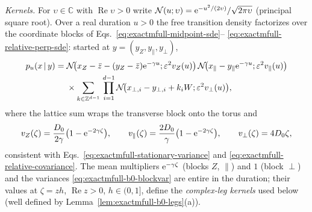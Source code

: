 \emph{Kernels.}
For \(\upsilon\in\mathbb C\) with \(\operatorname{Re}\upsilon>0\) write
\(\mathcal N(u;\upsilon)=\mathrm e^{-u^2/(2\upsilon)}/\sqrt{2\pi\upsilon}\)
(principal square root).  Over a real duration \(u>0\) the free transition
density factorizes over the coordinate blocks of
Eqs.~\eqref{eq:exactmfull-midpoint-sde}--%
\eqref{eq:exactmfull-relative-perp-sde}: started at
\(y=(y_Z,y_\parallel,y_\perp)\),
\begin{equation}
 \begin{split}
 p_u(x\,|\,y)
 ={}&\mathcal N\!\bigl(x_Z-\bar z-(y_Z-\bar z)\mathrm e^{-\gamma u};
   \varepsilon^2v_Z(u)\bigr)\,
  \mathcal N\!\bigl(x_\parallel-y_\parallel\mathrm e^{-\gamma u};
   \varepsilon^2v_\parallel(u)\bigr)\\
 &\times
  \sum_{k\in\mathbb Z^{d-1}}\,
  \prod_{i=1}^{d-1}
  \mathcal N\!\bigl(x_{\perp,i}-y_{\perp,i}+k_iW;
   \varepsilon^2v_\perp(u)\bigr),
 \end{split}
 \label{eq:exactmfull-b0-kernels}
\end{equation}
where the lattice sum wraps the transverse block onto the torus and
\begin{equation}
 v_Z(\zeta)=\frac{D_0}{2\gamma}\bigl(1-\mathrm e^{-2\gamma\zeta}\bigr),
 \qquad
 v_\parallel(\zeta)=\frac{2D_0}{\gamma}\bigl(1-\mathrm e^{-2\gamma\zeta}\bigr),
 \qquad
 v_\perp(\zeta)=4D_0\zeta,
 \label{eq:exactmfull-b0-blockvar}
\end{equation}
consistent with Eqs.~\eqref{eq:exactmfull-stationary-variance} and
\eqref{eq:exactmfull-relative-covariance}.  The mean multipliers
\(\mathrm e^{-\gamma\zeta}\) (blocks \(Z\), \(\parallel\)) and \(1\) (block
\(\perp\)) and the variances \eqref{eq:exactmfull-b0-blockvar} are entire in
the duration; their values at \(\zeta=zh\), \(\operatorname{Re}z>0\),
\(h\in(0,1]\), define the \emph{complex-leg kernels} used below (well
defined by Lemma~\ref{lem:exactmfull-b0-legs}(a)).

